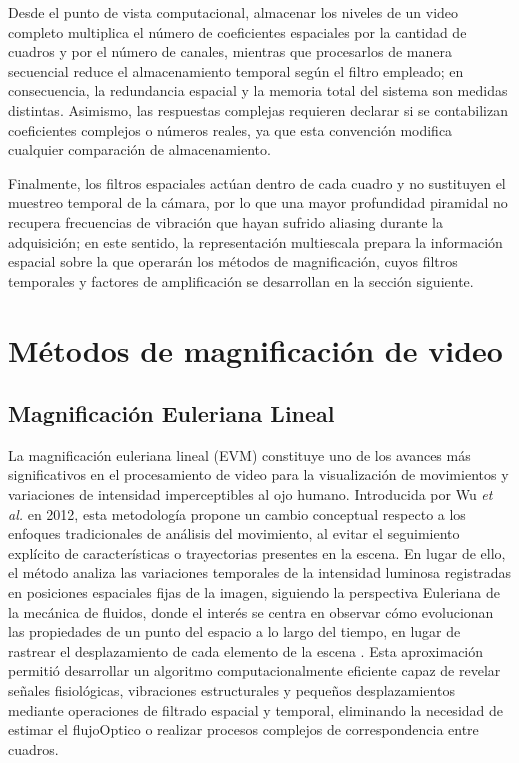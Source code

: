 Desde el punto de vista computacional, almacenar los niveles de un video completo multiplica el número de coeficientes espaciales por la cantidad de cuadros y por el número de canales, mientras que procesarlos de manera secuencial reduce el almacenamiento temporal según el filtro empleado; en consecuencia, la redundancia espacial y la memoria total del sistema son medidas distintas. Asimismo, las respuestas complejas requieren declarar si se contabilizan coeficientes complejos o números reales, ya que esta convención modifica cualquier comparación de almacenamiento.

Finalmente, los filtros espaciales actúan dentro de cada cuadro y no sustituyen el muestreo temporal de la cámara, por lo que una mayor profundidad piramidal no recupera frecuencias de vibración que hayan sufrido \gls{aliasing} durante la adquisición; en este sentido, la representación multiescala prepara la información espacial sobre la que operarán los métodos de magnificación, cuyos filtros temporales y factores de amplificación se desarrollan en la sección siguiente.

\section{Métodos de magnificación de video}
\label{subsec:metodos_magnificacion_video}
	
	\subsection{Magnificación Euleriana Lineal}
La magnificación euleriana lineal (\gls{EVM}) constituye uno de los avances más significativos en el procesamiento de video para la visualización de movimientos y variaciones de intensidad imperceptibles al ojo humano. Introducida por Wu \textit{et al.} en 2012, esta metodología propone un cambio conceptual respecto a los enfoques tradicionales de análisis del movimiento, al evitar el seguimiento explícito de características o trayectorias presentes en la escena. En lugar de ello, el método analiza las variaciones temporales de la intensidad luminosa registradas en posiciones espaciales fijas de la imagen, siguiendo la perspectiva Euleriana de la mecánica de fluidos, donde el interés se centra en observar cómo evolucionan las propiedades de un punto del espacio a lo largo del tiempo, en lugar de rastrear el desplazamiento de cada elemento de la escena \cite{wu2012eulerian}. Esta aproximación permitió desarrollar un algoritmo computacionalmente eficiente capaz de revelar señales fisiológicas, vibraciones estructurales y pequeños desplazamientos mediante operaciones de filtrado espacial y temporal, eliminando la necesidad de estimar el \gls{flujoOptico} o realizar procesos complejos de correspondencia entre cuadros.

